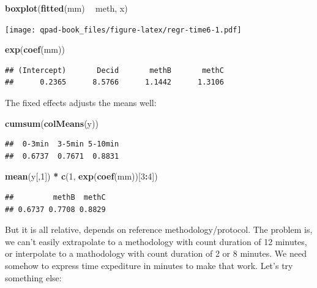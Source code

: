 \documentclass[12pt,]{book}
\newenvironment{Shaded}{\begin{snugshade}}{\end{snugshade}}
\newcommand{\DecValTok}[1]{\textcolor[rgb]{0.00,0.00,0.81}{#1}}
\newcommand{\KeywordTok}[1]{\textcolor[rgb]{0.13,0.29,0.53}{\textbf{#1}}}
\newcommand{\NormalTok}[1]{#1}
\newcommand{\OperatorTok}[1]{\textcolor[rgb]{0.81,0.36,0.00}{\textbf{#1}}}
\newcommand{\StringTok}[1]{\textcolor[rgb]{0.31,0.60,0.02}{#1}}
\begin{document}
\begin{Shaded}
\begin{Highlighting}[]
\KeywordTok{boxplot}\NormalTok{(}\KeywordTok{fitted}\NormalTok{(mm) }\OperatorTok{~}\StringTok{ }\NormalTok{meth, x)}
\end{Highlighting}
\end{Shaded}

\texttt{[image: qpad-book\_files/figure-latex/regr-time6-1.pdf]}

\begin{Shaded}
\begin{Highlighting}[]
\KeywordTok{exp}\NormalTok{(}\KeywordTok{coef}\NormalTok{(mm))}
\end{Highlighting}
\end{Shaded}

\begin{verbatim}
## (Intercept)       Decid       methB       methC 
##      0.2365      8.5766      1.1442      1.3106
\end{verbatim}

The fixed effects adjusts the means well:

\begin{Shaded}
\begin{Highlighting}[]
\KeywordTok{cumsum}\NormalTok{(}\KeywordTok{colMeans}\NormalTok{(y))}
\end{Highlighting}
\end{Shaded}

\begin{verbatim}
##  0-3min  3-5min 5-10min 
##  0.6737  0.7671  0.8831
\end{verbatim}

\begin{Shaded}
\begin{Highlighting}[]
\KeywordTok{mean}\NormalTok{(y[,}\DecValTok{1}\NormalTok{]) }\OperatorTok{*}\StringTok{ }\KeywordTok{c}\NormalTok{(}\DecValTok{1}\NormalTok{, }\KeywordTok{exp}\NormalTok{(}\KeywordTok{coef}\NormalTok{(mm))[}\DecValTok{3}\OperatorTok{:}\DecValTok{4}\NormalTok{])}
\end{Highlighting}
\end{Shaded}

\begin{verbatim}
##         methB  methC 
## 0.6737 0.7708 0.8829
\end{verbatim}

But it is all relative, depends on reference methodology/protocol.
The problem is, we can't easily extrapolate to a methodology
with count duration of 12 minutes, or interpolate to a mathodology
with count duration of 2 or 8 minutes.
We need somehow to express time expediture in minutes to make that work.
Let's try something else:
\end{document}
